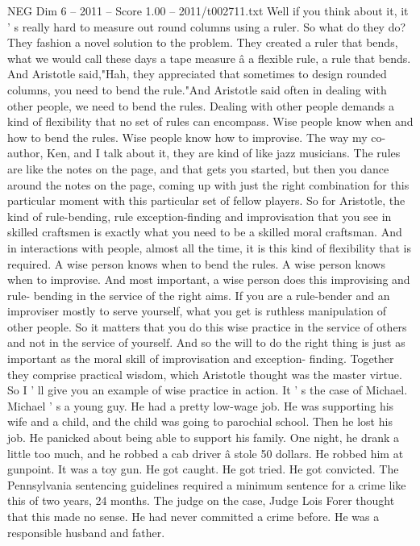\begin{textsample}{NEG Dim 6 – 2011 – Score 1.00 – 2011/t002711.txt}
Well if you think about it, it ' s really hard to measure out round columns using a ruler.
So what do they do?
They fashion a novel solution to the problem.
They created a ruler that bends, what we would call these days a tape measure â a flexible rule, a rule that bends.
And Aristotle said,"Hah, they appreciated that sometimes to design rounded columns, you need to bend the rule."And Aristotle said often in dealing with other people, we need to bend the rules.
Dealing with other people demands a kind of flexibility that no set of rules can encompass.
Wise people know when and how to bend the rules.
Wise people know how to improvise.
The way my co-author, Ken, and I talk about it, they are kind of like jazz musicians.
The rules are like the notes on the page, and that gets you started, but then you dance around the notes on the page, coming up with just the right combination for this particular moment with this particular set of fellow players.
So for Aristotle, the kind of rule-bending, rule exception-finding and improvisation that you see in skilled craftsmen is exactly what you need to be a skilled moral craftsman.
And in interactions with people, almost all the time, it is this kind of flexibility that is required.
A wise person knows when to bend the rules.
A wise person knows when to improvise.
And most important, a wise person does this improvising and rule- bending in the service of the right aims.
If you are a rule-bender and an improviser mostly to serve yourself, what you get is ruthless manipulation of other people.
So it matters that you do this wise practice in the service of others and not in the service of yourself.
And so the will to do the right thing is just as important as the moral skill of improvisation and exception- finding.
Together they comprise practical wisdom, which Aristotle thought was the master virtue.
So I ' ll give you an example of wise practice in action.
It ' s the case of Michael.
Michael ' s a young guy.
He had a pretty low-wage job.
He was supporting his wife and a child, and the child was going to parochial school.
Then he lost his job.
He panicked about being able to support his family.
One night, he drank a little too much, and he robbed a cab driver â stole 50 dollars.
He robbed him at gunpoint.
It was a toy gun.
He got caught.
He got tried.
He got convicted.
The Pennsylvania sentencing guidelines required a minimum sentence for a crime like this of two years, 24 months.
The judge on the case, Judge Lois Forer thought that this made no sense.
He had never committed a crime before.
He was a responsible husband and father.

\end{textsample}

